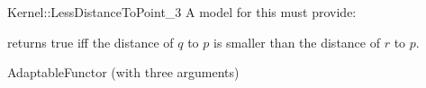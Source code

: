 \begin{ccRefFunctionObjectConcept}{Kernel::LessDistanceToPoint_3}
A model for this must provide:


{returns true iff the distance of $q$ to $p$ is
smaller than the distance of $r$ to $p$.}

\ccRefines
AdaptableFunctor (with three arguments)

\ccSeeAlso
{}

\end{ccRefFunctionObjectConcept}
